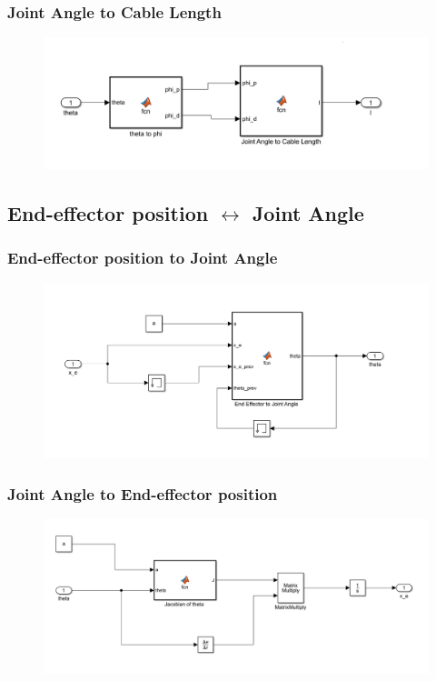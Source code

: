 \documentclass[a4paper,12pt]{report}
\begin{document}
\begin{appendices}
	\subsubsection{Joint Angle to Cable Length}
	\begin{figure}[H]
		\includegraphics[width=\textwidth]{images/g2-inv.png}
	\end{figure}
	
	\subsection{End-effector position $\leftrightarrow$ Joint Angle}

	\subsubsection{End-effector position to Joint Angle}
	\begin{figure}[H]
		\includegraphics[width=\textwidth]{images/g3-inv.png}
	\end{figure}
	\subsubsection{Joint Angle to End-effector position}
	\begin{figure}[H]
		\includegraphics[width=\textwidth]{images/g3.png}
	\end{figure}
	

\end{appendices}
\end{document}
